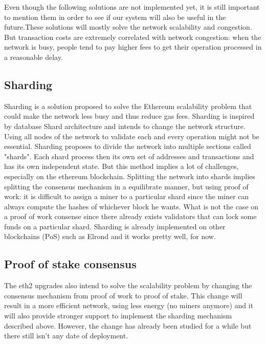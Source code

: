 Even though the following solutions are not implemented yet, it is still important to mention them in order to see if our system will also be useful in the future.These solutions will mostly solve the network scalability and congestion. But transaction costs are extremely correlated with network congestion: when the network is busy, people tend to pay higher fees to get their operation processed in a reasonable delay. 
\subsection{Sharding}
Sharding is a solution proposed to solve the Ethereum scalability problem that could make the network less busy and thus reduce gas fees. Sharding is inspired by database Shard architecture and intends to change the network structure. Using all nodes of the network to validate each and every operation might not be essential. Sharding proposes to divide the network into multiple sections called "shards". Each shard process then its own set of addresses and transactions and has its own independent state.
But this method implies a lot of challenges, especially on the ethereum blockchain.  Splitting the network into shards implies splitting the consensus mechanism in a equilibrate manner, but using proof of work: it is difficult to assign a miner to a particular shard since the miner can always compute the hashes of whichever block he wants. What is not the case on a proof of work consense since there already exists validators that can lock some funds on a particular shard.
Sharding is already implemented on other blockchains (PoS) such as Elrond and it works pretty well, for now. 
\subsection{Proof of stake consensus}
The eth2 upgrades also intend to solve the scalability problem by changing the consensus mechanism from proof of work to proof of stake. This change will result in a more efficient network, using less energy (no miners anymore) and it will also provide stronger support to implement the sharding mechanism described above. However, the change has already been studied for a while but there still isn't any date of deployment.
